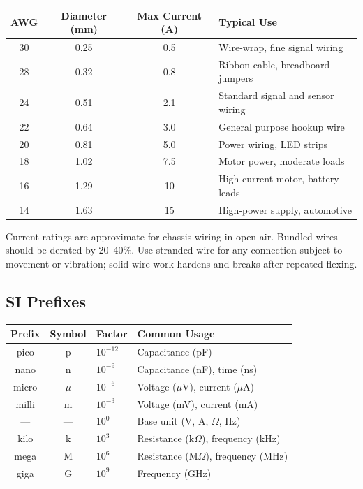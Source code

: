 \documentclass[11pt,letterpaper,twoside,openany]{book}
\begin{document}
\begin{center}
\begin{tabular}{cccl}
\toprule
\textbf{AWG} & \textbf{Diameter (mm)} & \textbf{Max Current (A)} & \textbf{Typical Use} \\
\midrule
30 & 0.25 & 0.5  & Wire-wrap, fine signal wiring \\
28 & 0.32 & 0.8  & Ribbon cable, breadboard jumpers \\
24 & 0.51 & 2.1  & Standard signal and sensor wiring \\
22 & 0.64 & 3.0  & General purpose hookup wire \\
20 & 0.81 & 5.0  & Power wiring, LED strips \\
18 & 1.02 & 7.5  & Motor power, moderate loads \\
16 & 1.29 & 10   & High-current motor, battery leads \\
14 & 1.63 & 15   & High-power supply, automotive \\
\bottomrule
\end{tabular}
\end{center}

Current ratings are approximate for chassis wiring in open air. Bundled wires should be derated by 20--40\%. Use stranded wire for any connection subject to movement or vibration; solid wire work-hardens and breaks after repeated flexing.

\subsection{SI Prefixes}

\begin{center}
\begin{tabular}{ccll}
\toprule
\textbf{Prefix} & \textbf{Symbol} & \textbf{Factor} & \textbf{Common Usage} \\
\midrule
pico  & p  & $10^{-12}$ & Capacitance (pF) \\
nano  & n  & $10^{-9}$  & Capacitance (nF), time (ns) \\
micro & $\mu$ & $10^{-6}$ & Voltage ($\mu$V), current ($\mu$A) \\
milli & m  & $10^{-3}$  & Voltage (mV), current (mA) \\
---   & ---  & $10^{0}$ & Base unit (V, A, $\Omega$, Hz) \\
kilo  & k  & $10^{3}$   & Resistance (k$\Omega$), frequency (kHz) \\
mega  & M  & $10^{6}$   & Resistance (M$\Omega$), frequency (MHz) \\
giga  & G  & $10^{9}$   & Frequency (GHz) \\
\bottomrule
\end{tabular}
\end{center}
\end{document}
